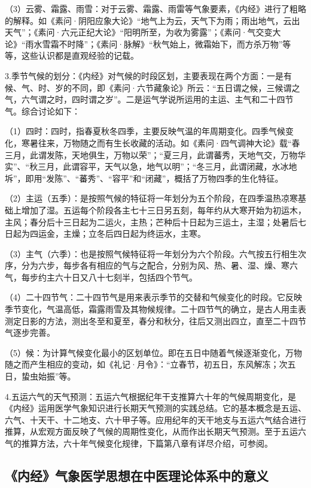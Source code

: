 \documentclass[draft,12pt]{ctexbook}
\begin{document}
（3）云雾、霜露、雨雪：对于云雾、霜露、雨雷等气象要素，《内经》进行了粗略的解释。如《素问·阴阳应象大论》“地气上为云，天气下为雨；雨出地气，云出天气”；《素问·六元正纪大论》“阳明所至，为收为雾露”；《素问·气交变大论》“雨水雪霜不时降”；《素问·脉解》“秋气始上，微霜始下，而方杀万物”等等，这些认识都是直观经验的记载。

3.季节气候的划分：《内经》对气候的时段区划，主要表现在两个方面：一是有候、气、时、岁的不同，即《素问·六节藏象论》所云：“五日谓之候，三候谓之气，六气谓之时，四时谓之岁”。二是运气学说所运用的主运、主气和二十四节气。综合讨论如下：

（1）四时：四时，指春夏秋冬四季，主要反映气温的年周期变化。四季气候变化，寒暑往来，万物随之而有生长收藏的活动。如《素问·四气调神大论》载“春三月，此谓发陈，天地俱生，万物以荣”；“夏三月，此谓蕃秀，天地气交，万物华实”、“秋三月，此谓容平，天气以急，地气以明”；“冬三月，此谓闭藏，水冰地坼”，即用“发陈”、“蕃秀”、“容平”和“闭藏”，概括了万物四季的生化特征。

（2）主运（五季）：是按照气候的特征将一年划分为五个阶段，在四季温热凉寒基础上增加了湿。五运每个阶段各主七十三日另五刻，每年约从大寒开始为初运木，主风；春分后十三日起为二运火，主热；芒种后十日起为三运土，主湿；处暑后七日起为四运金，主燥；立冬后四日起为终运水，主寒。

（3）主气（六季）：也是按照气候特征将一年划分为六个阶段。六气按五行相生次序，分为六步，每步各有相应的气与之配合，分别为风、热、暑、湿、燥、寒六气，每步约主六十日又八十七刻半，包括四个节气。

（4）二十四节气：二十四节气是用来表示季节的交替和气候变化的时段。它反映季节变化，气温高低，霜露雨雪及其物候规律。二十四节气的确立，是古人用圭表测定日影的方法，测出冬至和夏至，春分和秋分，往后又测出四立，直至二十四节气逐步完善。

（5）候：为计算气候变化最小的区划单位。即在五日中随着气候逐渐变化，万物随之而产生相应的变动，如《礼记·月令》：“立春节，初五日，东风解冻；次五日，蛰虫始振”等。

4.五运六气的天气预测：五运六气根据纪年干支推算六十年的气候周期变化，是《内经》运用医学气象知识进行长期天气预测的实践总结。它的基本概念是五运、六气、十天干、十二地支、六十甲子等。应用纪年的天干地支与五运六气结合进行推算，从宏观方面反映了气候的周期性变化，从而作出长期天气预测。至于五运六气的推算方法，六十年气候变化规律，下篇第八章有详尽介绍，可参阅。

\subsection{《内经》气象医学思想在中医理论体系中的意义}%
\end{document}
